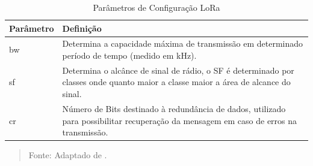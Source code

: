 \begin{table}[H]
    \centering
    \caption{Parâmetros de Configuração LoRa}
    \label{tab:parametros_lora}
    \begin{tabular}{|l|p{6cm}|}
        \toprule
        \textbf{Parâmetro} & \textbf{Definição} \\
        \midrule
        
        \gls{bw} & Determina a capacidade máxima de transmissão em determinado período de tempo (medido em kHz).\\
        \midrule
        
        \gls{sf} & Determina o alcânce de sinal de rádio, o SF é determinado por classes onde quanto maior a classe maior a área de alcance do sinal.\\
        \midrule
        
        \gls{cr} & Número de Bits destinado à redundância de dados, utilizado para possibilitar recuperação da mensagem em caso de erros na transmissão.\\
        \bottomrule
    \end{tabular}
    \begin{quote}
        Fonte: Adaptado de .
    \end{quote}
\end{table}